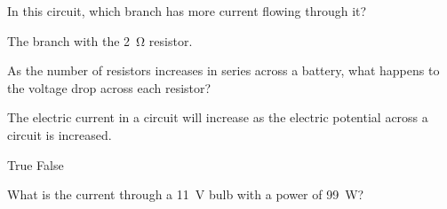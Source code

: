 \documentclass[answers]{exam}
\begin{document}
\begin{questions}

\question
In this circuit, which branch has more current flowing through it?

\ifprintanswers
{\color{red}
The branch with the \SI{2}{\ohm} resistor.
}
\else
\fillwithlines{1cm}
\fi

\begin{center}
\end{center}


\question
As the number of resistors increases in series across a battery, what happens to the voltage drop across each resistor?



\question
The electric current in a circuit will increase as the electric potential across a circuit is increased.

\begin{randomizechoices}[norandomize]
    \correctchoice True 
    \choice False
\end{randomizechoices}

\question
What is the current through a \SI{11}{V} bulb with a power of \SI{99}{W}? \fillin[\SI{9.0}{A}]



\end{questions}
\end{document}

